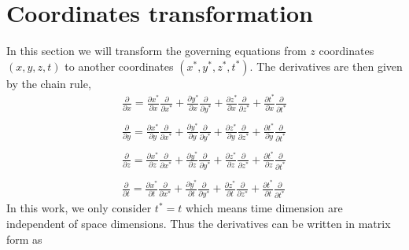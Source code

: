 \documentclass[oribibl]{llncs}
\begin{document}
\section{Coordinates transformation}
In this section we will transform the governing equations from $z$ coordinates $(x,y,z,t)$ to another coordinates $(x^*,y^*,z^*,t^*)$. The derivatives are then given by the chain rule,
\begin{eqnarray}
\frac{\partial}{\partial x} = \frac{\partial x^*}{\partial x} \frac{\partial}{\partial x^*} +  \frac{\partial y^*}{\partial x} \frac{\partial}{\partial y^*} +  \frac{\partial z^*}{\partial x} \frac{\partial}{\partial z^*} +  \frac{\partial t^*}{\partial x} \frac{\partial}{\partial t^*} \\ \nonumber \\ 
\frac{\partial}{\partial y} = \frac{\partial x^*}{\partial y} \frac{\partial}{\partial x^*} +  \frac{\partial y^*}{\partial y} \frac{\partial}{\partial y^*} +  \frac{\partial z^*}{\partial y} \frac{\partial}{\partial z^*} +  \frac{\partial t^*}{\partial y} \frac{\partial}{\partial t^*} \\ \nonumber \\ 
\frac{\partial}{\partial z} = \frac{\partial x^*}{\partial z} \frac{\partial}{\partial x^*} +  \frac{\partial y^*}{\partial z} \frac{\partial}{\partial y^*} +  \frac{\partial z^*}{\partial z} \frac{\partial}{\partial z^*} +  \frac{\partial t^*}{\partial z} \frac{\partial}{\partial t^*} \\ \nonumber \\ 
\frac{\partial}{\partial t} = \frac{\partial x^*}{\partial t} \frac{\partial}{\partial x^*} +  \frac{\partial y^*}{\partial t} \frac{\partial}{\partial y^*} +  \frac{\partial z^*}{\partial t} \frac{\partial}{\partial z^*} +  \frac{\partial t^*}{\partial t} \frac{\partial}{\partial t^*}
\end{eqnarray}
In this work, we only consider $t^*=t$ which means time dimension are independent of space dimensions. Thus the derivatives can be written in matrix form as
\end{document}
